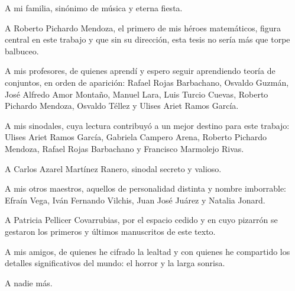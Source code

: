\documentclass[11pt]{unam_tesis1}
\theoremstyle{MyThmStyle}
\theoremstyle{definition}
\theoremstyle{plain}
\theoremstyle{remark}
\begin{document}
\begin{center}
\end{center}
\newpage\leavevmode\thispagestyle{empty}\newpage

\pagestyle{fancy}
\begin{acknowledgments}

A mi familia, sin\'onimo de m\'usica y eterna fiesta.

A Roberto Pichardo Mendoza, el primero de mis h\'eroes matem\'aticos, figura central en este trabajo y que sin su direcci\'on, esta tesis no ser\'ia m\'as que torpe balbuceo.

A mis profesores, de quienes aprend\'i y espero seguir aprendiendo teor\'ia de conjuntos, en orden de aparici\'on: Rafael Rojas Barbachano, Osvaldo Guzm\'an, Jos\'e Alfredo Amor Monta\~no, Manuel Lara, Luis Turcio Cuevas, Roberto Pichardo Mendoza, Osvaldo T\'ellez y Ulises Ariet Ramos Garc\'ia.

A mis sinodales, cuya lectura contribuy\'o a un mejor destino para este trabajo: Ulises Ariet Ramos Garc\'ia, Gabriela Campero Arena, Roberto Pichardo Mendoza, Rafael Rojas Barbachano y Francisco Marmolejo Rivas.

A Carlos Azarel Mart\'inez Ranero, sinodal secreto y valioso.

A mis otros maestros, aquellos de personalidad distinta y nombre imborrable: Efra\'in Vega, Iv\'an Fernando Vilchis, Juan Jos\'e Ju\'arez y Natalia Jonard.

A Patricia Pellicer Covarrubias, por el espacio cedido y en cuyo pizarr\'on se gestaron los primeros y \'ultimos manuscritos de este texto.

A mis amigos, de quienes he cifrado la lealtad y con quienes he compartido los detalles significativos del mundo: el horror y la larga sonrisa.

A nadie m\'as.
\end{acknowledgments}
\newpage\leavevmode\thispagestyle{empty}\newpage
\end{document}
